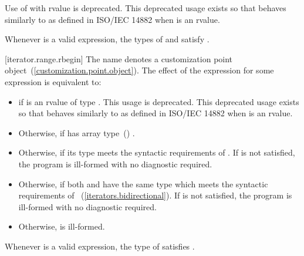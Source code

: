 {\pnum
Use of  with rvalue  is deprecated.
\enternote This deprecated usage exists so that 
behaves similarly to  as defined in ISO/IEC 14882 when
 is an rvalue. \exitnote

\pnum
\enternote Whenever  is a valid expression, the
types of  and  satisfy
. \exitnote

[iterator.range.rbegin]{}
\pnum
The name  denotes a customization point
object~(\ref{customization.point.object}). The effect of the expression
 for some expression  is equivalent
to:

\begin{itemize}
\item
   if  is an rvalue of
  type . This usage is deprecated.
  \enternote This deprecated usage exists so that
   behaves similarly to 
  as defined in ISO/IEC 14882 when  is an rvalue. \exitnote

\item
  Otherwise,  if
   has array type~() .

\item
  Otherwise,  if its type  meets the
  syntactic requirements of . If 
  is not satisfied, the program is ill-formed with no diagnostic
  required.

\item
  Otherwise,  if both
   and  have the same
  type  which meets the syntactic requirements of
  ~(\ref{iterators.bidirectional}).
  If  is not satisfied, the program
  is ill-formed with no diagnostic required.

\item
  Otherwise,  is ill-formed.
\end{itemize}

\pnum
\remark Whenever  is a valid expression, the
type of  satisfies .

}
